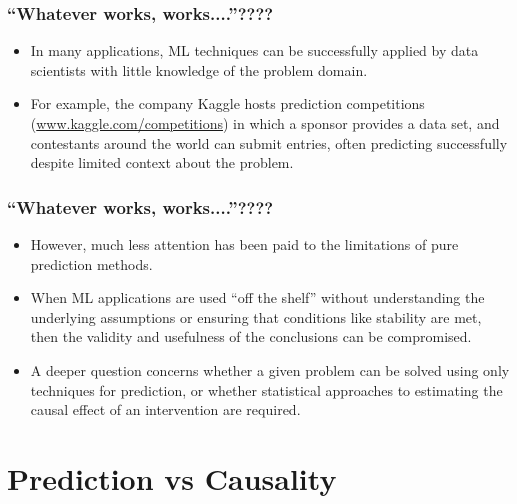 \documentclass[
  shownotes,
  xcolor={svgnames},
  hyperref={colorlinks,citecolor=DarkBlue,linkcolor=andesred,urlcolor=DarkBlue}
  , aspectratio=169]{beamer}
\begin{document}
\begin{frame}
\frametitle{``Whatever works, works....''????}


\begin{itemize}
\item In many applications, ML techniques can be successfully applied by data scientists with little knowledge of the problem domain. 

\medskip
\item For example, the company Kaggle hosts prediction competitions (\url{www.kaggle.com/competitions}) in which a sponsor provides a data set, and contestants around the world can submit entries, often predicting successfully despite limited context about the problem.

\end{itemize}

\end{frame}
\begin{frame}
\frametitle{``Whatever works, works....''????}


\begin{itemize}

  \item  However, much less attention has been paid to the limitations of pure prediction methods. 
\medskip
  \item When ML applications are used ``off the shelf'' without understanding the underlying assumptions or ensuring that conditions like stability are met, then the validity and usefulness of the conclusions can be compromised. 

  \medskip
  \item A deeper question concerns whether a given problem can be solved using only techniques for prediction, or whether statistical approaches to estimating the causal effect of an intervention are required.

\end{itemize}

\end{frame}
\section{Prediction vs Causality}
\end{document}
